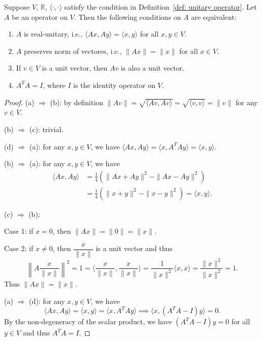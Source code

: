 \documentclass{ctexart}
\newcommand{\R}{\mathbb{R}}
\begin{document}
    \begin{mythm}
        Suppose $V$, $\R$, $\langle \cdot, \cdot \rangle$ satisfy the condition in Definition~\ref{def: unitary operator}. Let $A$ be an operator on $V$. Then the following conditions on $A$ are equivalent:
        \begin{enumerate}[label=(\alph*)]
            \item $A$ is real-unitary, i.e., $\langle A x, A y \rangle = \langle x, y \rangle$ for all $x,y \in V$.
            \item $A$ preserves norm of vectores, i.e., $\|A x\| = \|x\|$ for all $x \in V$.
            \item If $v\in V$ is a unit vector, then $A v$ is also a unit vector.
            \item $A^T A = I$, where $I$ is the identity operator on $V$.
        \end{enumerate}
    \end{mythm}
    \begin{proof}
        (a) $\Rightarrow$ (b): by definition $\| Av \| = \sqrt{\langle Av, Av \rangle} = \sqrt{\langle v, v \rangle} = \|v\|$ for any $v\in V$.

        (b) $\Rightarrow$ (c): trivial.

        (d) $\Rightarrow$ (a): for any $x,y \in V$, we have $\langle A x, A y \rangle = \langle x, A^T A y \rangle = \langle x, y \rangle$.

        (b) $\Rightarrow$ (a): for any $x,y \in V$, we have
        \[
        \begin{aligned}
            \langle A x, A y \rangle &= \frac14 \left( \|A x + A y\|^2 - \|A x - A y\|^2 \right)\\  &= \frac{1}{4} \left( \|x + y\|^2 - \|x - y\|^2 \right) = \langle x, y \rangle.
        \end{aligned}
        \]

        (c) $\Rightarrow$ (b): 
        
        Case 1: if $x=0$, then $\|A x\| = \|0\| = \|x\|$. 
        
        Case 2: if $x\neq 0$, then $\dfrac{x}{\|x\|}$ is a unit vector and thus
        $$ \left\| A\frac{x}{\|x\|}\right\| ^2 = 1 = \langle \frac{x}{\|x\|}, \frac{x}{\|x\|} \rangle = \frac1{\|x\|^2} \langle x, x \rangle = \frac{\|x\|^2}{\|x\|^2} = 1. $$
        Thus $\|A x\| = \|x\|$.

        (a) $\Rightarrow$ (d): for any $x,y \in V$, we have
        $$ \langle Ax, A y \rangle = \langle x,y \rangle = \langle x, A^T A y \rangle \implies \langle x, (A^T A - I) y \rangle = 0. $$
        By the non-degeneracy of the scalar product, we have $(A^T A - I) y = 0$ for all $y\in V$ and thus $A^T A = I$.
    \end{proof}
\end{document}
